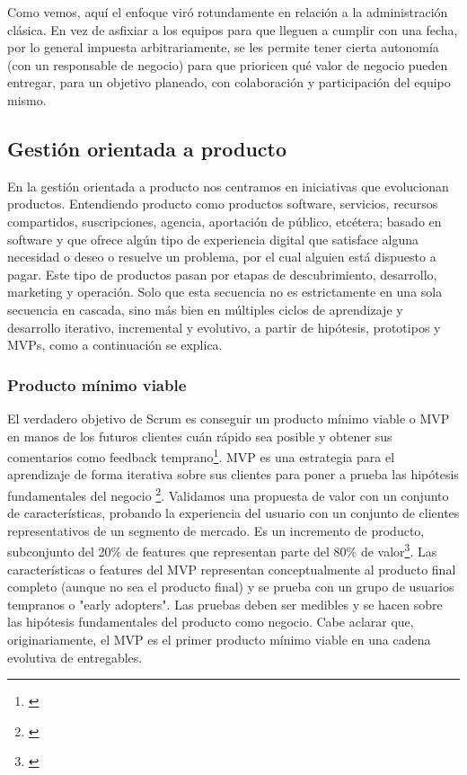 Como vemos, aquí el enfoque viró rotundamente en relación a la administración clásica. En vez de asfixiar a los equipos para que lleguen a cumplir con una fecha, por lo general impuesta arbitrariamente, se les permite tener cierta autonomía (con un responsable de negocio) para que prioricen qué valor de negocio pueden entregar, para un objetivo planeado, con colaboración y participación del equipo mismo.

\subsection{Gestión orientada a producto}

En la gestión orientada a producto nos centramos en iniciativas que evolucionan productos. Entendiendo producto como productos software, servicios, recursos compartidos, suscripciones, agencia, aportación de público, etcétera; basado en software y que ofrece algún tipo de experiencia digital que satisface alguna necesidad o deseo o resuelve un problema, por el cual alguien está dispuesto a pagar. Este tipo de productos pasan por etapas de descubrimiento, desarrollo, marketing y operación. Solo que esta secuencia no es estrictamente en una sola secuencia en cascada, sino más bien en múltiples ciclos de aprendizaje y desarrollo iterativo, incremental y evolutivo, a partir de hipótesis, prototipos y MVPs, como a continuación se explica. 

\subsubsection{Producto mínimo viable}

El verdadero objetivo de Scrum es conseguir un producto mínimo viable o MVP en manos de los futuros clientes cuán rápido sea posible y obtener sus comentarios como feedback temprano\footnote{\cite{Jeff-Sutherland-2016}}. MVP es una estrategia para el aprendizaje de forma iterativa sobre sus clientes para poner a prueba las hipótesis fundamentales del negocio \footnote{\cite{Greg-Gehrich-2012}}. Validamos una propuesta de valor con un conjunto de características, probando la experiencia del usuario con un conjunto de clientes representativos de un segmento de mercado. Es un incremento de producto, subconjunto del 20\% de features que representan parte del 80\% de valor\footnote{\cite{Jeff-Sutherland-2016}}. Las características o features del MVP representan conceptualmente al producto final completo (aunque no sea el producto final) y se prueba con un grupo de usuarios tempranos o "early adopters". Las pruebas deben ser medibles y se hacen sobre las hipótesis fundamentales del producto como negocio. Cabe aclarar que, originariamente, el MVP es el primer producto mínimo viable en una cadena evolutiva de entregables. 


